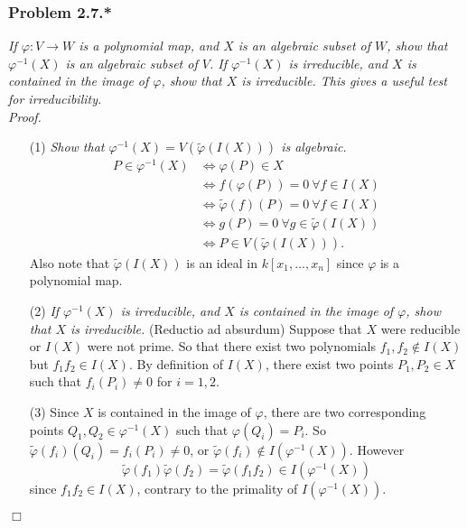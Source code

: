 \documentclass{article}
\begin{document}



\subsubsection*{Problem 2.7.*}
\emph{If $\varphi: V \to W$ is a polynomial map,
and $X$ is an algebraic subset of $W$,
show that $\varphi^{-1}(X)$ is an algebraic subset of $V$.
If $\varphi^{-1}(X)$ is irreducible,
and $X$ is contained in the image of $\varphi$, show that $X$ is irreducible.
This gives a useful test for irreducibility.} \\



\emph{Proof.}
\begin{enumerate}
\item[(1)]
  \emph{Show that $\varphi^{-1}(X) = V(\widetilde{\varphi}(I(X)))$ is algebraic.}
  \begin{align*}
    P \in \varphi^{-1}(X)
    &\Longleftrightarrow
    \varphi(P) \in X \\
    &\Longleftrightarrow
    f(\varphi(P)) = 0 \: \forall f \in I(X) \\
    &\Longleftrightarrow
    \widetilde{\varphi}(f)(P) = 0 \: \forall f \in I(X) \\
    &\Longleftrightarrow
    g(P) = 0 \: \forall g \in \widetilde{\varphi}(I(X)) \\
    &\Longleftrightarrow
    P \in V(\widetilde{\varphi}(I(X))).
  \end{align*}
  Also note that $\widetilde{\varphi}(I(X))$ is an ideal in $k[x_1,\ldots,x_n]$
  since $\varphi$ is a polynomial map.

\item[(2)]
  \emph{If $\varphi^{-1}(X)$ is irreducible,
  and $X$ is contained in the image of $\varphi$, show that $X$ is irreducible.}
  (Reductio ad absurdum)
  Suppose that $X$ were reducible or $I(X)$ were not prime.
  So that there exist two polynomials $f_1, f_2 \not\in I(X)$ but $f_1 f_2 \in I(X)$.
  By definition of $I(X)$, there exist two points $P_1, P_2 \in X$
  such that $f_i(P_i) \neq 0$ for $i = 1, 2$.

\item[(3)]
  Since $X$ is contained in the image of $\varphi$,
  there are two corresponding points $Q_1, Q_2 \in \varphi^{-1}(X)$ such that
  $\varphi(Q_i) = P_i$.
  So $\widetilde{\varphi}(f_i)(Q_i) = f_i(P_i) \neq 0$,
  or $\widetilde{\varphi}(f_i) \not\in I(\varphi^{-1}(X))$.
  However
  \[
    \widetilde{\varphi}(f_1)\widetilde{\varphi}(f_2)
    = \widetilde{\varphi}(f_1 f_2)
    \in I(\varphi^{-1}(X))
  \]
  since $f_1 f_2 \in I(X)$,
  contrary to the primality of $I(\varphi^{-1}(X))$.
\end{enumerate}
$\Box$ \\\\
\end{document}
